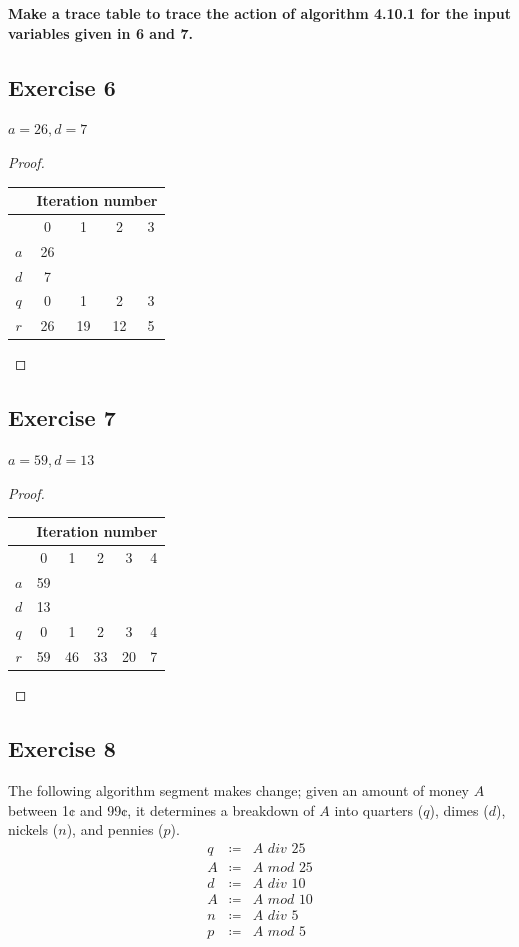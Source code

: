 \documentclass[14pt]{extarticle}
\newcommand{\cy}{\color{cyan}}
\begin{document}
{\bf \cy Make a trace table to trace the action of algorithm 4.10.1 for the input variables given in 6 and 7.}

\subsection{Exercise 6}
$a = 26, d = 7$

\begin{proof}
\begin{center}
\begin{tabular}{|c|c|c|c|c|}
\hline
 & \multicolumn{4}{c|}{{\bf \cy Iteration number}} \\
\hline
 & 0 & 1 & 2 & 3 \\
\hline
$a$ & 26 &  &  &  \\
\hline
$d$ & 7 &  &  &  \\
\hline
$q$ & 0 & 1 & 2 & 3 \\
\hline
$r$ & 26 & 19 & 12 & 5 \\
\hline
\end{tabular}
\end{center}
\end{proof}

\subsection{Exercise 7}
$a = 59, d = 13$

\begin{proof}
\begin{center}
\begin{tabular}{|c|c|c|c|c|c|}
\hline
 & \multicolumn{5}{c|}{{\bf \cy Iteration number}} \\
\hline
 & 0 & 1 & 2 & 3 & 4 \\
\hline
$a$ & 59 &  &  & & \\
\hline
$d$ & 13 &  &  & & \\
\hline
$q$ & 0 & 1 & 2 & 3 & 4 \\
\hline
$r$ & 59 & 46 & 33 & 20 & 7 \\
\hline
\end{tabular}
\end{center}
\end{proof}

\subsection{Exercise 8}
The following algorithm segment makes change; given an amount of money $A$ between 1¢ and 99¢, it determines a breakdown of $A$ into quarters ($q$), dimes ($d$), nickels ($n$), and pennies ($p$).
\[
\begin{array}{rcl}
q & \coloneqq & A \,\, div \,\, 25 \\
A & \coloneqq & A \,\, mod \,\, 25 \\
d & \coloneqq & A \,\, div \,\, 10 \\
A & \coloneqq & A \,\, mod \,\, 10 \\
n & \coloneqq & A \,\, div \,\, 5 \\
p & \coloneqq & A \,\, mod \,\, 5
\end{array}
\]
\end{document}
